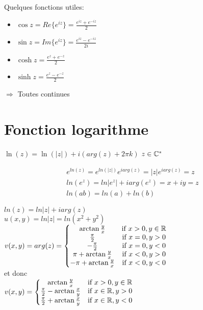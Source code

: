 Quelques fonctions utiles:
\begin{itemize}
	\item $\cos{z} = Re\{e^{iz}\} = \frac{e^{iz}+e^{-iz}}{2}$
	\item $\sin{z} = Im\{e^{iz}\}= \frac{e^{iz}-e^{-iz}}{2i}$
	
	\item $\cosh{z} = \frac{e^{z}+e^{-z}}{2}$
	\item $\sinh{z} = \frac{e^{z}-e^{-z}}{2}$
	
\end{itemize}

$\Rightarrow$ Toutes continues
	
\section{Fonction logarithme}
\begin{myDefinition}
	$\ln(z) = \ln(|z|) + i \left ( arg(z) + 2 \pi k \right )$ $z \in \mathbb{C}^*$
\end{myDefinition}

\begin{myProperty}
	\begin{eqnarray*}
		e^{ln(z)} = e^{ln(|z|)}e^{iarg(z)} = |z|e^{iarg(z)} = z
		\\
		ln(e^z)=ln|e^z| + iarg(e^z) = x + iy = z
		\\
		ln(ab)=ln(a) + ln(b)
	\end{eqnarray*}
\end{myProperty}

$ln(z) =ln|z| + iarg(z)$
\\
$u(x,y)=ln|z| = ln(x^2+y^2)$
\\
$v(x,y)= arg(z) = \left\{\begin{matrix}  
\arctan \frac{y}{x} &\mbox{if}\ x > 0, y \in \mathbb{R} 
\\
\frac{\pi}{2} &\mbox{if}\ x = 0, y>0 
\\
-\frac{\pi}{2} &\mbox{if}\ x = 0, y<0 
\\
\pi+\arctan \frac{y}{x} &\mbox{if}\ x <0, y>0
\\
-\pi+\arctan \frac{y}{x} &\mbox{if}\ x<0, y<0
\end{matrix}\right.$
\\
et donc
\\

$v(x,y) = \left\{\begin{matrix}  
\arctan \frac{y}{x} &\mbox{if}\ x > 0, y \in \mathbb{R} 
\\ 
\frac{\pi}{2}-\arctan \frac{x}{y} &\mbox{if}\ x \in \mathbb{R}, y>0
\\
\frac{\pi}{2}+\arctan \frac{x}{y} &\mbox{if}\ x \in \mathbb{R}, y<0
\end{matrix}\right.$

